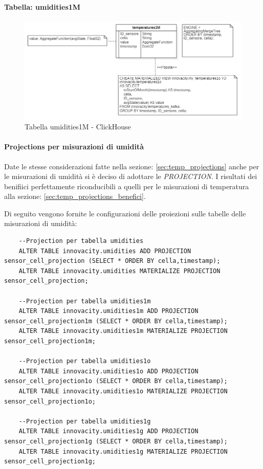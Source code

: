    \paragraph{Tabella:  umidities1M}
    \begin{figure}[H]
        \centering
        \includegraphics[width=1\textwidth]{../Images/SpecificaTecnica/temperatures1Mese.PNG}
        \caption{Tabella  umidities1M - ClickHouse}
        \label{fig: umidities1M}
        \end{figure}
\paragraph{Projections per misurazioni di umidità} 
Date le stesse considerazioni fatte nella sezione: \ref{sec:temp_projections} anche per le misurazioni di umidità si è deciso di adottare le \textit{PROJECTION}.
I risultati dei benifiici perfettamente riconducibili a quelli per le misurazioni di temperatura alla sezione: \ref{sec:temp_projections_benefici}.

Di seguito vengono fornite le configurazioni delle proiezioni sulle tabelle delle misurazioni di umidità:

\begin{lstlisting}
    --Projection per tabella umidities
    ALTER TABLE innovacity.umidities ADD PROJECTION sensor_cell_projection (SELECT * ORDER BY cella,timestamp);
    ALTER TABLE innovacity.umidities MATERIALIZE PROJECTION sensor_cell_projection;

    --Projection per tabella umidities1m
    ALTER TABLE innovacity.umidities1m ADD PROJECTION sensor_cell_projection1m (SELECT * ORDER BY cella,timestamp);
    ALTER TABLE innovacity.umidities1m MATERIALIZE PROJECTION sensor_cell_projection1m;

    --Projection per tabella umidities1o
    ALTER TABLE innovacity.umidities1o ADD PROJECTION sensor_cell_projection1o (SELECT * ORDER BY cella,timestamp);
    ALTER TABLE innovacity.umidities1o MATERIALIZE PROJECTION sensor_cell_projection1o;

    --Projection per tabella umidities1g
    ALTER TABLE innovacity.umidities1g ADD PROJECTION sensor_cell_projection1g (SELECT * ORDER BY cella,timestamp);
    ALTER TABLE innovacity.umidities1g MATERIALIZE PROJECTION sensor_cell_projection1g;
\end{lstlisting}